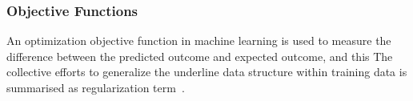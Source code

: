 \subsubsection{Objective Functions}
An optimization objective function in machine learning is used to measure the difference between the predicted outcome and expected outcome, and this The collective efforts to generalize the underline data structure within training data is summarised as regularization term~\cite{goodfellow_2015}.  